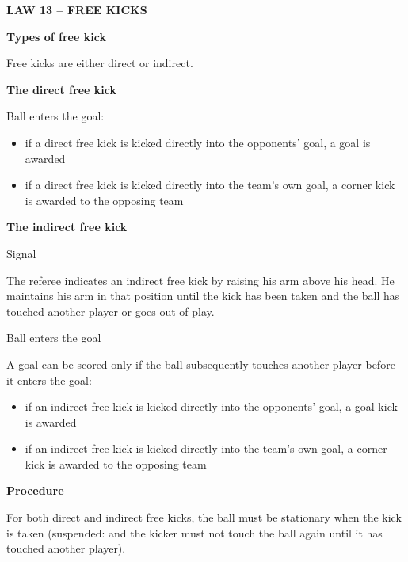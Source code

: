 \clearpage
\sffamily
{\bfseries\textcolor[rgb]{0.4,0.4,0.4}{LAW 13 -- FREE KICKS} }

\bigskip

{\bfseries Types of free kick}

\headlinebox

Free kicks are either direct or indirect.

\bigskip

{\bfseries The direct free kick }

\headlinebox

Ball enters the goal:

\begin{itemize}
\item if a direct free kick is kicked directly into the
opponents{\textquoteright} goal, a goal is awarded
\item if a direct free kick is kicked directly into the team's own goal, a corner kick is awarded to the opposing team
\end{itemize}

\bigskip

{\bfseries The indirect free kick}

\headlinebox

Signal

The referee indicates an indirect free kick by raising his arm above his head. He maintains his arm in that position until the kick has been taken and the ball has touched another player or goes out of play.

\bigskip

Ball enters the goal

A goal can be scored only if the ball subsequently touches another player before it enters the goal:

\begin{itemize}
\item if an indirect free kick is kicked directly into the
opponents' goal, a goal kick is awarded
\item if an indirect free kick is kicked directly into the
team's own goal, a corner kick is awarded to the
opposing team
\end{itemize}

\bigskip

{\bfseries Procedure}

\headlinebox

For both direct and indirect free kicks, the ball must be stationary when the kick is taken 
\textcolor[rgb]{0.4,0.4,0.4}{(suspended: and the
kicker must not touch the ball again until it has touched another player)}.

